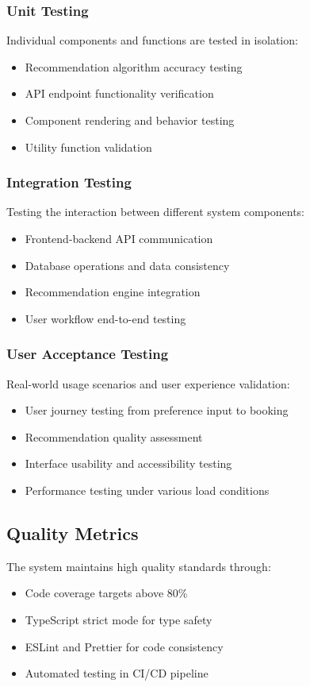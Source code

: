 \documentclass[12pt,a4paper]{article}
\begin{document}
\subsubsection{Unit Testing}
Individual components and functions are tested in isolation:
\begin{itemize}
    \item Recommendation algorithm accuracy testing
    \item API endpoint functionality verification
    \item Component rendering and behavior testing
    \item Utility function validation
\end{itemize}

\subsubsection{Integration Testing}
Testing the interaction between different system components:
\begin{itemize}
    \item Frontend-backend API communication
    \item Database operations and data consistency
    \item Recommendation engine integration
    \item User workflow end-to-end testing
\end{itemize}

\subsubsection{User Acceptance Testing}
Real-world usage scenarios and user experience validation:
\begin{itemize}
    \item User journey testing from preference input to booking
    \item Recommendation quality assessment
    \item Interface usability and accessibility testing
    \item Performance testing under various load conditions
\end{itemize}

\subsection{Quality Metrics}
The system maintains high quality standards through:
\begin{itemize}
    \item Code coverage targets above 80\%
    \item TypeScript strict mode for type safety
    \item ESLint and Prettier for code consistency
    \item Automated testing in CI/CD pipeline
\end{itemize}
\end{document}

